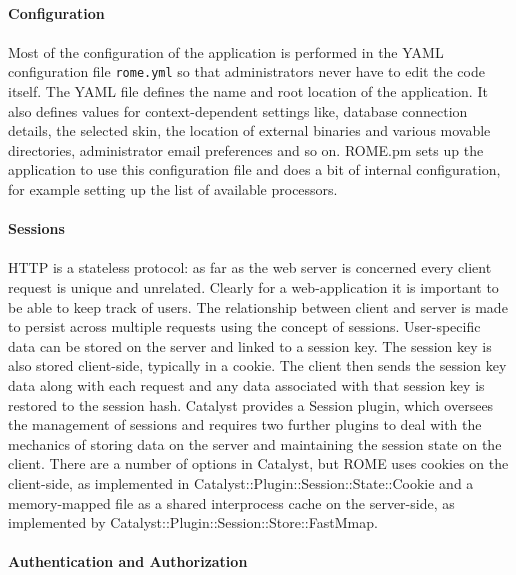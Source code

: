 \paragraph{Configuration}
\paragraph{}
Most of the configuration of the application is performed in the YAML configuration file \texttt{rome.yml} so that administrators never have to edit the code itself. The YAML file defines the name and root location of the application. It also defines values for context-dependent settings like, database connection details, the selected skin, the location of external binaries and various movable directories, administrator email preferences and so on. ROME.pm sets up the application to use this configuration file and does a bit of internal configuration, for example setting up the list of available processors.



\paragraph{Sessions}
\paragraph{}
HTTP is a stateless protocol: as far as the web server is concerned every client request is unique and unrelated. Clearly for a web-application it is important to be able to keep track of users. The relationship between client and server is made to persist across multiple requests using the concept of sessions. User-specific data can be stored on the server and linked to a session key. The session key is also stored client-side, typically in a cookie. The client then sends the session key data along with each request and any data associated with that session key is restored to the session hash. Catalyst provides a Session plugin, which oversees the management of sessions and requires two further plugins to deal with the mechanics of storing data on the server and maintaining the session state on the client. There are a number of options in Catalyst, but ROME uses cookies on the client-side, as implemented in Catalyst::Plugin::Session::State::Cookie and a memory-mapped file as a shared interprocess cache on the server-side, as implemented by Catalyst::Plugin::Session::Store::FastMmap.


\paragraph{Authentication and Authorization}

